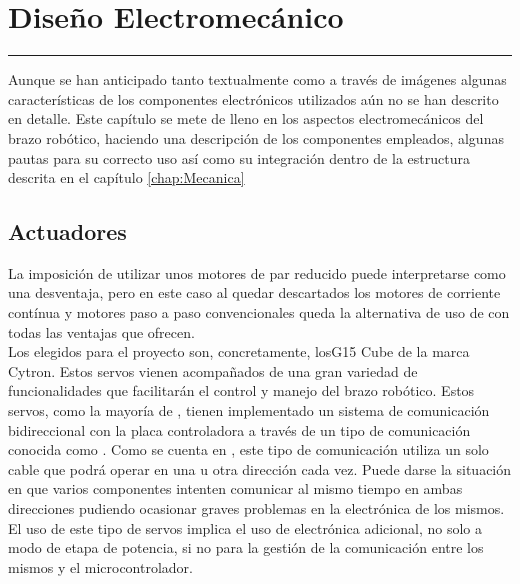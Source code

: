 \chapter{Diseño Electromecánico} \label{chap:Electronica}
\hrule
\vspace{3mm}

Aunque se han anticipado tanto textualmente como a través de imágenes algunas características de los componentes electrónicos utilizados aún no se han descrito en detalle. Este capítulo se mete de lleno en los aspectos electromecánicos del brazo robótico, haciendo una descripción de los componentes empleados, algunas pautas para su correcto uso así como su integración dentro de la estructura descrita en el capítulo \ref{chap:Mecanica}

\section{Actuadores} \label{sec:Electronica:Actuadores}
\label{sec:Electronica:Actuadores:G15}

    La imposición de utilizar unos motores de par reducido puede interpretarse como una desventaja, pero en este caso al quedar descartados los motores de corriente contínua y motores paso a paso convencionales queda la alternativa de uso de  con todas las ventajas que ofrecen.
    \\

    Los  elegidos para el proyecto son, concretamente, losG15 Cube de la marca Cytron. Estos servos vienen acompañados de una gran variedad de funcionalidades que facilitarán el control y manejo del brazo robótico. Estos servos, como la mayoría de , tienen implementado un sistema de comunicación bidireccional con la placa controladora a través de un tipo de comunicación conocida como . Como se cuenta en \cite{embeddedSystems}, este tipo de comunicación utiliza un solo cable que podrá operar en una u otra dirección cada vez. Puede darse la situación en que varios componentes intenten comunicar al mismo tiempo en ambas direcciones pudiendo ocasionar graves problemas en la electrónica de los mismos. El uso de este tipo de servos implica el uso de electrónica adicional, no solo a modo de etapa de potencia, si no para la gestión de la comunicación entre los mismos y el microcontrolador.
    \\

